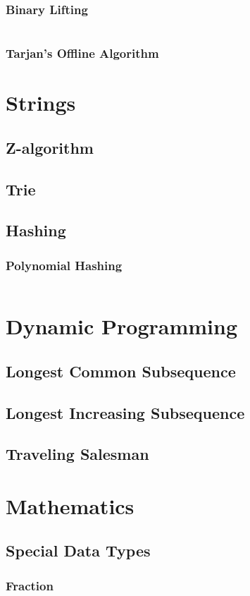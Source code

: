 \documentclass[8pt,a4paper,landscape,oneside]{amsart}
\newcommand{\code}[1]{\inputminted[fontsize=\normalsize,baselinestretch=1]{cpp}{_code/#1}}
\begin{document}
\begin{multicols*}{3}
		\subsubsection{Binary Lifting}
      \code{graphs/lca/binary_lifting.cpp}
		\subsubsection{Tarjan's Offline Algorithm}
\section{Strings}
	\subsection{Z-algorithm}
	\subsection{Trie}
	\subsection{Hashing}
    \subsubsection{Polynomial Hashing}
      \code{strings/polynomial_hashing.cpp}
\section{Dynamic Programming}
	\subsection{Longest Common Subsequence}
	\subsection{Longest Increasing Subsequence}
	\subsection{Traveling Salesman}
\section{Mathematics}
	\subsection{Special Data Types}
		\subsubsection{Fraction}

\end{multicols*}
\end{document}
